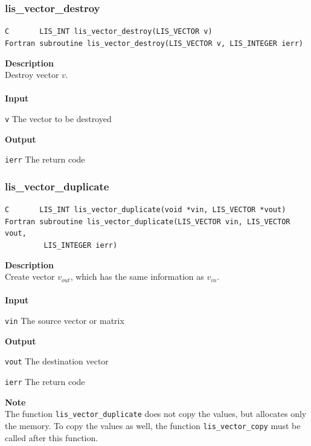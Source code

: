 \documentclass[a4paper]{article}
\newcommand{\namelistlabel}[1]{\mbox{#1}\hfill}
\newenvironment{namelist}[1]{%
\begin{list}{}
  {\let\makelabel\namelistlabel
  \settowidth{\labelwidth}{#1}
  \setlength{\leftmargin}{1.1\labelwidth}}
  }{%
\end{list}}
\begin{document}
\subsubsection{lis\_vector\_destroy}
\begin{screen}
\verb|C       LIS_INT lis_vector_destroy(LIS_VECTOR v)|\\
\verb|Fortran subroutine lis_vector_destroy(LIS_VECTOR v, LIS_INTEGER ierr)|
\end{screen}
{\bf Description}\\
\indent
Destroy vector $v$.
\\ \\
\noindent
{\bf Input}
\begin{namelist}{XXXXXXXXXXXXXXXXXXXX}
\item[\tt v] The vector to be destroyed
\end{namelist}
{\bf Output}
\begin{namelist}{XXXXXXXXXXXXXXXXXXXX}
\item[\tt ierr] The return code
\end{namelist}

\newpage
\subsubsection{lis\_vector\_duplicate}
\begin{screen}
\verb|C       LIS_INT lis_vector_duplicate(void *vin, LIS_VECTOR *vout)|
\verb|Fortran subroutine lis_vector_duplicate(LIS_VECTOR vin, LIS_VECTOR vout,|\\
\verb|         LIS_INTEGER ierr)|
\end{screen}
{\bf Description}\\
\indent
Create vector $v_{out}$, which has the same information as $v_{in}$.
\\ \\
\noindent
{\bf Input}
\begin{namelist}{XXXXXXXXXXXXXXXXXXXX}
\item[\tt vin] The source vector or matrix
\end{namelist}
{\bf Output}
\begin{namelist}{XXXXXXXXXXXXXXXXXXXX}
\item[\tt vout] The destination vector
\item[\tt ierr] The return code
\end{namelist}
{\bf Note}\\
\indent
The function \verb|lis_vector_duplicate| does not copy the values, 
but allocates only the memory. To copy the values as well, 
the function \verb|lis_vector_copy| must be called after this function.
\end{document}
